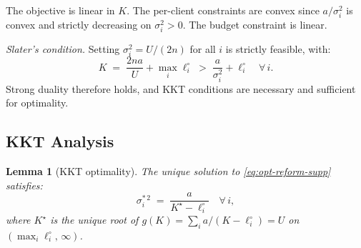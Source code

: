 \documentclass[letterpaper,journal]{IEEEtran}
\newtheorem{lemma}[theorem]{Lemma}
\begin{document}
\noindent The objective is linear in $K$. The per-client constraints are
convex since $a/\sigma_i^2$ is convex and strictly decreasing
on $\sigma_i^2 > 0$. The budget constraint is linear.

\medskip
\noindent\textit{Slater's condition.} Setting $\sigma_i^2 =
U/(2n)$ for all $i$ is strictly feasible, with:
\[
K \;=\; \frac{2na}{U} + \max_i \ell_i^\circ
\;>\; \frac{a}{\sigma_i^2} + \ell_i^\circ
\quad \forall\, i.
\]
Strong duality therefore holds, and KKT conditions are
necessary and sufficient for optimality.

\subsection{KKT Analysis}

\begin{lemma}[KKT optimality]
\label{lem:kkt}
The unique solution to \eqref{eq:opt-reform-supp} satisfies:
\[
\sigma_i^{*\,2} \;=\; \frac{a}{K^\star - \ell_i^\circ}
\quad \forall\, i,
\]
where $K^\star$ is the unique root of
$g(K) = \sum_i a/(K - \ell_i^\circ) = U$ on
$({\max_i \ell_i^\circ},\, \infty)$.
\end{lemma}
\end{document}
